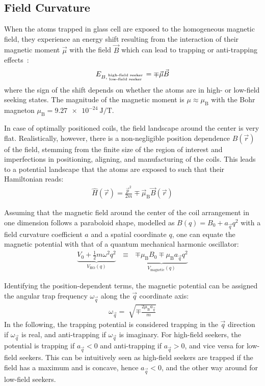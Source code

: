 \subsection*{Field Curvature}\label{ch:field_curvature_definition}
When the atoms trapped in glass cell are exposed to the homogeneous magnetic field, they experience an energy shift resulting from the interaction of their magnetic moment $\vec \mu$ with the field $\vec B$ which can lead to trapping or anti-trapping effects~\cite{pritchard_cooling_1983,gehm_properties_2003, hagemann_setup_2020}:
\begin{align}
    E_{B, {\text{high-field seeker} \atop \text{low-field seeker}}} = \mp \vec \mu \vec B
\end{align}
where the sign of the shift depends on whether the atoms are in high- or low-field seeking states. The magnitude of the magnetic moment is $\mu \approx \mu_\text{B}$ with the Bohr magneton $\mu_\text{B} = \SI{9.27e-24}{\joule\per\tesla}$.

In case of optimally positioned coils, the field landscape around the center is very flat. Realistically, however, there is a non-negligible position dependence $B(\vec r)$ of the field, stemming from the finite size of the region of interest and imperfections in positioning, aligning, and manufacturing of the coils. This leads to a potential landscape that the atoms are exposed to such that their Hamiltonian reads:
\begin{align}
    \hat H(\vec r) = \frac{\vec p^2}{2m} \mp \vec \mu_\text{B} \vec B(\vec r)
\end{align}

Assuming that the magnetic field around the center of the coil arrangement in one dimension follows a paraboloid shape, modelled as $B(q) = B_0 + a_{\vec q} q^2$ with a field curvature coefficient $a$ and a spatial coordinate $q$, one can equate the magnetic potential with that of a quantum mechanical harmonic oscillator:
\begin{align}
    \underbrace{V_0 + \frac{1}{2}m\omega^2q^2}_{V_\text{HO}(q)} ~~~\equiv~~~ \underbrace{\mp \mu_\text{B} B_0 \mp \mu_\text{B} a_{\vec q} q^2}_{V_\text{magnetic}(q)}
\end{align}

Identifying the position-dependent terms, the magnetic potential can be assigned the angular trap frequency $\omega_{\vec q}$ along the $\vec q$ coordinate axis:
\begin{align}\label{eq:trap_omega_definition}
    \omega_{\vec q} = \sqrt[]{\mp\frac{2 \mu_\text{B} a_{\vec q}}{m}}
\end{align}
In the following, the trapping potential is considered trapping in the ${\vec q}$ direction if $\omega_{\vec q}$ is real, and anti-trapping if $\omega_{\vec q}$ is imaginary. For high-field seekers, the potential is trapping if $a_{\vec q} < 0$ and anti-trapping if $a_{\vec q} > 0$, and vice versa for low-field seekers. This can be intuitively seen as high-field seekers are trapped if the field has a maximum and is concave, hence $a_{\vec q} < 0$, and the other way around for low-field seekers.

